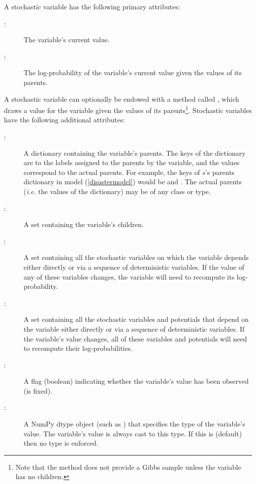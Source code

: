 A stochastic variable has the following primary attributes:
\begin{description}
    \item[:] The variable's current value.
    \item[:] The log-probability of the variable's current value given the values of its parents.
\end{description}
A stochastic variable can optionally be endowed with a method called , which draws a value for the variable given the values of its parents\footnote{Note that the  method does not provide a Gibbs sample unless the variable has no children.}. Stochastic variables have the following additional attributes:
\begin{description}
    \item[:] A dictionary containing the variable's parents. The keys of the dictionary are to the labels assigned to the parents by the variable, and the values correspond to the actual parents. For example, the keys of $s$'s parents dictionary in model (\ref{disastermodel}) would be  and . The actual parents (\emph{i.e.} the values of the dictionary) may be of any class or type.
    \item[:] A set containing the variable's children.
    \item[:] A set containing all the stochastic variables on which the variable depends either directly or via a sequence of deterministic variables. If the value of any of these variables changes, the variable will need to recompute its log-probability.
    \item[:] A set containing all the stochastic variables and potentials that depend on the variable either directly or via a sequence of deterministic variables. If the variable's value changes, all of these variables and potentials will need to recompute their log-probabilities.
    \item[:] A flag (boolean) indicating whether the variable's value has been observed (is fixed).
    \item[:] A NumPy dtype object (such as ) that specifies the type of the variable's value. The variable's value is always cast to this type. If this is  (default) then no type is enforced.
\end{description}

